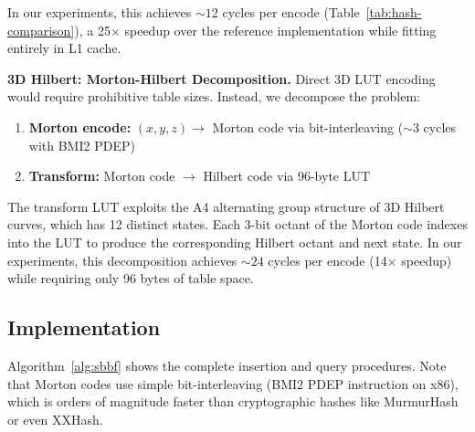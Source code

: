 \documentclass[conference,a4paper]{IEEEtran}
\begin{document}
In our experiments, this achieves ${\sim}12$ cycles per encode (Table~\ref{tab:hash-comparison}), a 25$\times$ speedup over the reference implementation while fitting entirely in L1 cache.

\textbf{3D Hilbert: Morton-Hilbert Decomposition.} Direct 3D LUT encoding would require prohibitive table sizes. Instead, we decompose the problem:
\begin{enumerate}
    \item \textbf{Morton encode:} $(x, y, z) \rightarrow$ Morton code via bit-interleaving (${\sim}3$ cycles with BMI2 PDEP)
    \item \textbf{Transform:} Morton code $\rightarrow$ Hilbert code via 96-byte LUT
\end{enumerate}

The transform LUT exploits the A4 alternating group structure of 3D Hilbert curves, which has 12 distinct states. Each 3-bit octant of the Morton code indexes into the LUT to produce the corresponding Hilbert octant and next state. In our experiments, this decomposition achieves ${\sim}24$ cycles per encode (14$\times$ speedup) while requiring only 96 bytes of table space.


\begin{algorithm}[!ht]
\caption{SBBF Core Operations}\label{alg:sbbf}
\end{algorithm}
\subsection{Implementation}
Algorithm~\ref{alg:sbbf} shows the complete insertion and query procedures. Note that Morton codes use simple bit-interleaving (BMI2 PDEP instruction on x86), which is orders of magnitude faster than cryptographic hashes like MurmurHash or even XXHash.
\end{document}
